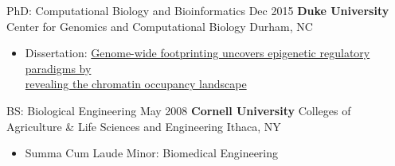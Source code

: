 
\begin{resentries}

  \resentrybeta
	{PhD: Computational Biology and Bioinformatics}
	{Dec 2015}
	{\textbf{Duke University} \xspace \bullet \xspace \xspace Center for Genomics and Computational Biology}
	{Durham, NC}
    {
      \begin{itemize}[leftmargin=*] %
		\item{Dissertation: \href{https://dukespace.lib.duke.edu/dspace/handle/10161/11371}{\color{blue} Genome-wide footprinting uncovers epigenetic regulatory paradigms by\\ revealing the chromatin occupancy landscape}}
      \end{itemize}
    }

  \resentrybeta
	{BS: Biological Engineering}
	{May 2008}
	{\textbf{Cornell University} \xspace \bullet \xspace \xspace Colleges of Agriculture \& Life Sciences and Engineering}
	{Ithaca, NY}
    {
      \begin{itemize}[leftmargin=*] %
		\item{Summa Cum Laude \xspace \bullet \xspace \xspace Minor: Biomedical Engineering}
      \end{itemize}
    }
\end{resentries}
